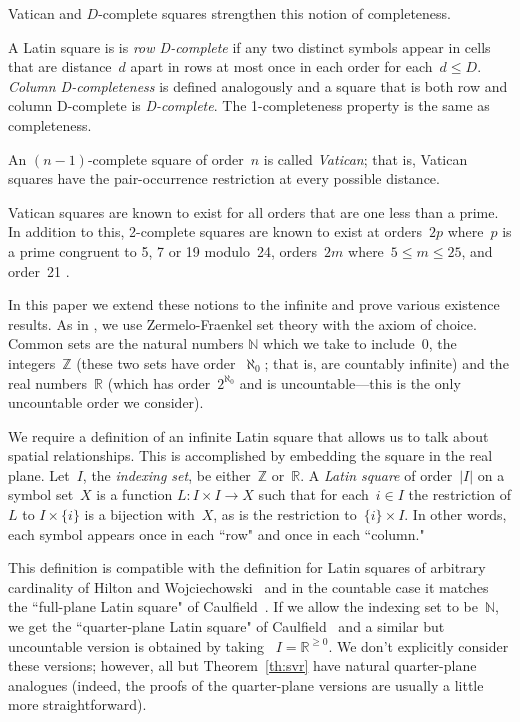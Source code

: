 \documentclass[12pt,a4paper]{article}
\newcommand{\Z}{\mathbb{Z}}
\newcommand{\N}{\mathbb{N}}
\newcommand{\R}{\mathbb{R}}
\begin{document}
Vatican and $D$-complete  squares strengthen this notion of completeness.

A Latin square is is {\em row D-complete} if any two distinct symbols appear in cells that are distance~$d$ apart in rows at most once in each order for each~$d \leq D$. {\em Column D-completeness} is defined analogously and a square that is both row and column D-complete is {\em D-complete}.  The 1-completeness property is the same as completeness.

An $(n-1)$-complete square of order~$n$ is called {\em Vatican}; that is, Vatican squares have the pair-occurrence restriction at every possible distance.

Vatican squares are known to exist for all orders that are one less than a prime.  In addition to this, 2-complete squares are known to exist at orders~$2p$ where~$p$ is a prime congruent to 5, 7 or 19 modulo~24, orders~$2m$ where~$5 \leq m \leq 25$, and order~21 \cite{TuscanCRC,OllisTFSG}.


In this paper we extend these notions to the infinite and prove various existence results.  As in \cite{CW02}, we use Zermelo-Fraenkel set theory with the axiom of choice.   Common sets are the natural numbers $\N$ which we take to include~0, the integers~$\Z$ (these two sets have order~$\aleph_0$; that is, are countably infinite) and the real numbers~$\R$ (which has order~$2^{\aleph_0}$ and is uncountable---this is the only uncountable order we consider).




We require a definition of an infinite Latin square that allows us to talk about spatial relationships.  This is accomplished by embedding the square in the real plane.  Let~$I$, the {\em indexing set}, be either~$\Z$ or~$\R$.  A {\em Latin square} of order~$|I|$ on a symbol set~$X$ is a function $L: I \times I \rightarrow X$ such that for each~$i \in I$ the restriction of $L$ to $I \times \{i\}$ is a bijection with~$X$, as is the restriction to~$\{i\} \times I$.   In other words, each symbol appears once in each ``row" and once in each ``column."

This definition is  compatible with the definition for Latin squares of arbitrary cardinality of Hilton and Wojciechowski~\cite{HW05} and in the countable case it matches the ``full-plane Latin square" of Caulfield~\cite{Caulfield96}.  If we allow the indexing set to be~$\N$, we get the ``quarter-plane Latin square" of Caulfield~\cite{Caulfield96} and a similar but uncountable version is obtained by taking ~$I = \R^{\geq 0}$.  We don't explicitly consider these versions; however, all but Theorem~\ref{th:svr} have natural quarter-plane analogues (indeed, the proofs of the quarter-plane versions are usually a little more straightforward).
\end{document}
